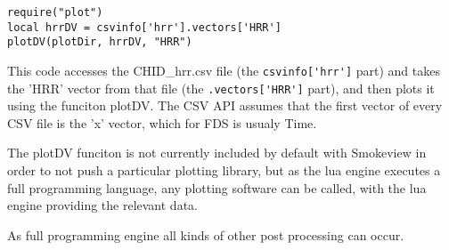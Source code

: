\documentclass[11pt,twoside]{book}
\begin{document}
\begin{lstlisting}[style=lua]
require("plot")
local hrrDV = csvinfo['hrr'].vectors['HRR']
plotDV(plotDir, hrrDV, "HRR")
\end{lstlisting}

This code accesses the CHID\_hrr.csv file (the \lstinline{csvinfo['hrr']} part)
and takes the 'HRR' vector from that file (the \lstinline{.vectors['HRR']}
part), and then plots it using the funciton plotDV. The CSV API assumes that the
first vector of every CSV file is the 'x' vector, which for FDS is usualy Time.

The plotDV funciton is not currently included by default with Smokeview in order
to not push a particular plotting library, but as the lua engine executes a full
programming language, any plotting software can be called, with the lua engine
providing the relevant data.

As full programming engine all kinds of other post processing can occur.
\end{document}
